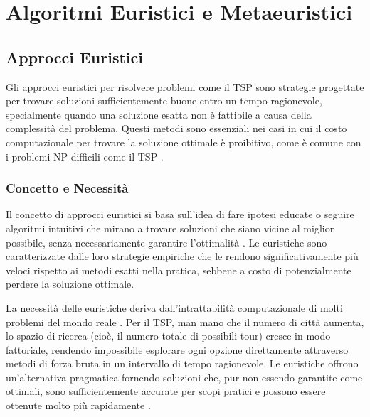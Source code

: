 
%

\chapter{Algoritmi Euristici e Metaeuristici}\label{chapt:4}
\section{Approcci Euristici}

Gli approcci euristici per risolvere problemi come il \gls{TSP} sono strategie progettate per trovare soluzioni sufficientemente buone entro un tempo ragionevole, specialmente quando una soluzione esatta non è fattibile a causa della complessità \cite{Johnson2002} del problema. Questi metodi sono essenziali nei casi in cui il costo computazionale per trovare la soluzione ottimale è proibitivo, come è comune con i problemi NP-difficili come il \gls{TSP} \cite{Cormen2009}.

\subsection{Concetto e Necessità}
Il concetto di approcci euristici si basa sull'idea di fare ipotesi educate o seguire algoritmi intuitivi che mirano a trovare soluzioni che siano vicine al miglior possibile, senza necessariamente garantire l'ottimalità \cite{Papadimitriou1998}. Le euristiche sono caratterizzate dalle loro strategie empiriche che le rendono significativamente più veloci rispetto ai metodi esatti nella pratica, sebbene a costo di potenzialmente perdere la soluzione ottimale.

La necessità delle euristiche deriva dall'intrattabilità computazionale di molti problemi del mondo reale \cite{Lawler1985}. Per il \gls{TSP}, man mano che il numero di città aumenta, lo spazio di ricerca (cioè, il numero totale di possibili tour) cresce in modo fattoriale, rendendo impossibile esplorare ogni opzione direttamente attraverso metodi di forza bruta in un intervallo di tempo ragionevole\cite{Gutin2016}. Le euristiche offrono un'alternativa pragmatica fornendo soluzioni che, pur non essendo garantite come ottimali, sono sufficientemente accurate per scopi pratici e possono essere ottenute molto più rapidamente \cite{Aarts1989}.

